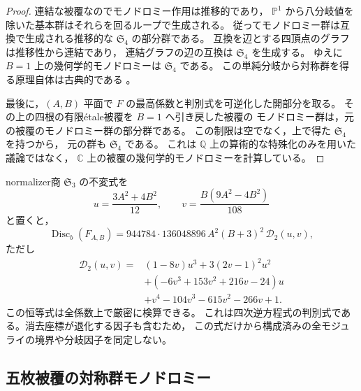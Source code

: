 \begin{proof}
連結な被覆なのでモノドロミー作用は推移的であり，
$\mathbb P^1$ から八分岐値を除いた基本群はそれらを回るループで生成される。
従ってモノドロミー群は互換で生成される推移的な $\mathfrak S_4$ の部分群である。
互換を辺とする四頂点のグラフは推移性から連結であり，
連結グラフの辺の互換は $\mathfrak S_4$ を生成する。
ゆえに $B=1$ 上の幾何学的モノドロミーは $\mathfrak S_4$ である。
この単純分岐から対称群を得る原理自体は古典的である
\cite[Introduction, pp.~1, 3]{AllcockHall2008}。

最後に，$(A,B)$ 平面で $F$ の最高係数と判別式を可逆化した開部分を取る。
その上の四根の有限\'{e}tale被覆を $B=1$ へ引き戻した被覆の
モノドロミー群は，元の被覆のモノドロミー群の部分群である。
この制限は空でなく，上で得た $\mathfrak S_4$ を持つから，
元の群も $\mathfrak S_4$ である。
これは $\mathbb Q$ 上の算術的な特殊化のみを用いた議論ではなく，
$\mathbb C$ 上の被覆の幾何学的モノドロミーを計算している。
\end{proof}

\begin{remark}[不変式による判別式の短い表示]
\label{rem:binary-shadow-invariant-discriminant}
normalizer商 $\mathfrak S_3$ の不変式を
\[
 u=\frac{3A^2+4B^2}{12},\qquad
 v=\frac{B(9A^2-4B^2)}{108}
\]
と置くと，
\[
 \operatorname{Disc}_b(F_{A,B})
 =944784\cdot136048896\,A^2(B+3)^2\,\mathscr D_2(u,v),
\]
ただし
\begin{align*}
 \mathscr D_2(u,v)
 ={}&(1-8v)u^3+3(2v-1)^2u^2\\
 &+(-6v^3+153v^2+216v-24)u\\
 &+v^4-104v^3-615v^2-266v+1.
\end{align*}
この恒等式は全係数上で厳密に検算できる。
これは四次逆方程式の判別式である。消去座標が退化する因子も含むため，
この式だけから構成済みの全モジュライの境界や分岐因子を同定しない。
\end{remark}

\subsection{五枚被覆の対称群モノドロミー}
\label{subsec:degree-one-shadow-monodromy}

